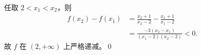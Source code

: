 任取 $2<x_1<x_2$，则
\[
\begin{aligned}
f(x_2)-f(x_1)
&=\frac{x_2+1}{x_2-2}-\frac{x_1+1}{x_1-2}\\
&=\frac{-3(x_2-x_1)}{(x_1-2)(x_2-2)}<0.
\end{aligned}
\]
故 $f$ 在 $(2,+\infty)$ 上严格递减。\qed
